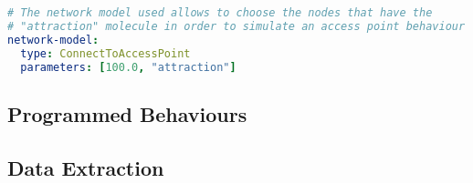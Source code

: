 \begin{lstlisting}[language=yaml, label=code:linking, caption=Defining the linking rule: only nodes with the molecule \texttt{attraction} will connect to other nodes within a radius of 100 meters.]
# The network model used allows to choose the nodes that have the
# "attraction" molecule in order to simulate an access point behaviour
network-model:
  type: ConnectToAccessPoint
  parameters: [100.0, "attraction"]
\end{lstlisting}

\subsection{Programmed Behaviours}

\subsection{Data Extraction}